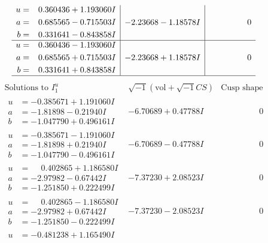 \documentclass[1p]{elsarticle_modified}
\theoremstyle{definition}
\newcommand{\I}{\sqrt{-1}}
\begin{document}
$$\begin{array}{c|c|c}
\begin{aligned}
u &= \phantom{-}0.360436 + 1.193060 I \\
a &= \phantom{-}0.685565 - 0.715503 I \\
b &= \phantom{-}0.331641 - 0.843858 I\end{aligned}
 & -2.23668 - 1.18578 I & \phantom{-0.000000 } 0 \\ \hline\begin{aligned}
u &= \phantom{-}0.360436 - 1.193060 I \\
a &= \phantom{-}0.685565 + 0.715503 I \\
b &= \phantom{-}0.331641 + 0.843858 I\end{aligned}
 & -2.23668 + 1.18578 I & \phantom{-0.000000 } 0\\
 \hline 
 \end{array}$$\newpage$$\begin{array}{c|c|c}  
\text{Solutions to }I^u_{1}& \I (\text{vol} + \sqrt{-1}CS) & \text{Cusp shape}\\
 \hline 
\begin{aligned}
u &= -0.385671 + 1.191060 I \\
a &= -1.81898 - 0.21940 I \\
b &= -1.047790 + 0.496161 I\end{aligned}
 & -6.70689 + 0.47788 I & \phantom{-0.000000 } 0 \\ \hline\begin{aligned}
u &= -0.385671 - 1.191060 I \\
a &= -1.81898 + 0.21940 I \\
b &= -1.047790 - 0.496161 I\end{aligned}
 & -6.70689 - 0.47788 I & \phantom{-0.000000 } 0 \\ \hline\begin{aligned}
u &= \phantom{-}0.402865 + 1.186580 I \\
a &= -2.97982 - 0.67442 I \\
b &= -1.251850 + 0.222499 I\end{aligned}
 & -7.37230 + 2.08523 I & \phantom{-0.000000 } 0 \\ \hline\begin{aligned}
u &= \phantom{-}0.402865 - 1.186580 I \\
a &= -2.97982 + 0.67442 I \\
b &= -1.251850 - 0.222499 I\end{aligned}
 & -7.37230 - 2.08523 I & \phantom{-0.000000 } 0 \\ \hline\begin{aligned}
u &= -0.481238 + 1.165490 I \\

\end{aligned}
\end{array}$$
\end{document}
